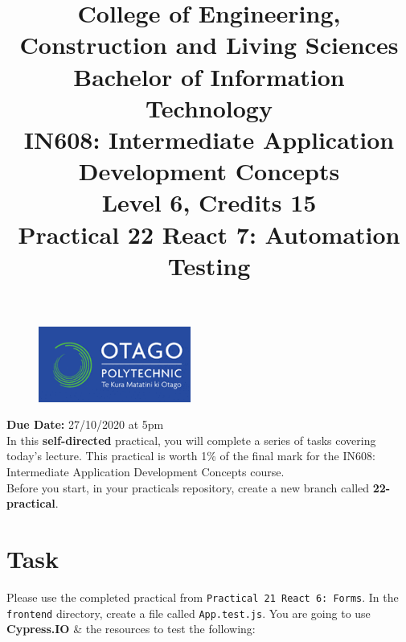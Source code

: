 \documentclass{article}
\author{}
\begin{document}
\begin{figure}
	\centering
	\includegraphics[width=50mm]{img/logo.png}
\end{figure}

\title{College of Engineering, Construction and Living Sciences\\Bachelor of Information Technology\\IN608: Intermediate Application Development Concepts\\Level 6, Credits 15\\\textbf{Practical 22 React 7: Automation Testing}} 
\date{}
\maketitle

\textbf{Due Date:} 27/10/2020 at 5pm \\

In this \textbf{self-directed} practical, you will complete a series of tasks covering today's lecture. This practical is worth 1\% of the final mark for the IN608: Intermediate Application Development Concepts course. \\

Before you start, in your practicals repository, create a new branch called \textbf{22-practical}. 

\section*{Task} 
Please use the completed practical from \texttt{Practical 21 React 6: Forms}. In the \texttt{frontend} directory, create a file called \texttt{App.test.js}. You are going to use \textbf{Cypress.IO} \& the resources to test the following:
\end{document}
